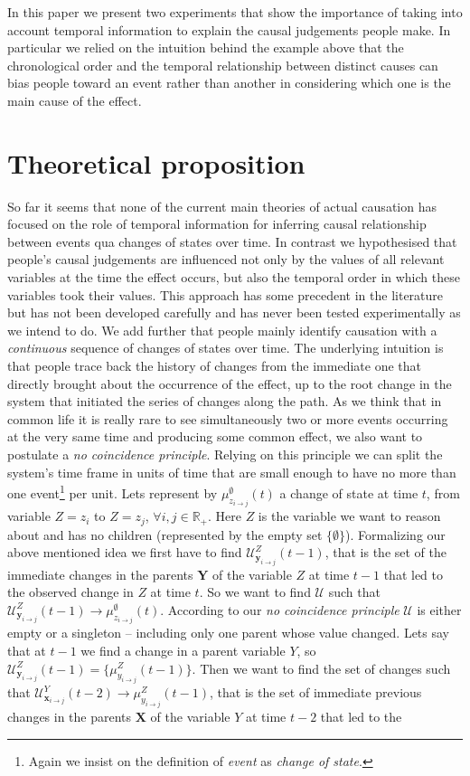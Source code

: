 \documentclass[10pt,letterpaper]{article}
\begin{document}
In this paper we present two experiments that show the importance of taking into account temporal information to explain the causal judgements people make. In particular we relied on the intuition behind the example above that the chronological order and the temporal relationship between distinct causes can bias people toward an event rather than another in considering which one is the main cause of the effect.

\section{Theoretical proposition}

So far it seems that none of the current main theories of actual causation has focused on the role of temporal information for inferring causal relationship between events qua changes of states over time. In contrast we hypothesised that people's causal judgements are influenced not only by the values of all relevant variables at the time the effect occurs, but also the temporal order in which these variables took their values. This approach has some precedent in the literature but has not been developed carefully and has never been tested experimentally as we intend to do. We add further that people mainly identify causation with a \textit{continuous} sequence of changes of states over time. The underlying intuition is that people trace back the history of changes from the immediate one that directly brought about the occurrence of the effect, up to the root change in the system that initiated the series of changes along the path. As we think that in common life it is really rare to see simultaneously two or more events occurring at the very same time and producing some common effect, we also want to postulate a \textit{no coincidence principle}. Relying on this principle we can split the system's time frame in units of time that are small enough to have no more than one event\footnote{Again we insist on the definition of \textit{event} as \textit{change of state}.} per unit. Lets represent by $\mu^{\emptyset}_{z_{i\rightarrow j}}(t)$ a change of state at time $t$, from variable $Z=z_i$ to $Z=z_j$, $\forall i,j\in \mathds{R}_+$. Here $Z$ is the variable we want to reason about and has no children (represented by the empty set $\{\emptyset\}$). Formalizing our above mentioned idea we first have to find $\mathcal{U}^Z_{\bm{y}_{i\rightarrow j}}(t-1)$, that is the set of the immediate changes in the parents $\bm{Y}$ of the variable $Z$ at time $t-1$ that led to the observed change in $Z$ at time $t$. So we want to find $\mathcal{U}$ such that $\mathcal{U}^Z_{\bm{y}_{i\rightarrow j}}(t-1)\rightarrow \mu^{\emptyset}_{z_{i\rightarrow j}}(t)$. According to our \textit{no coincidence principle} $\mathcal{U}$ is either empty or a singleton -- including only one parent whose value changed. Lets say that at $t-1$ we find a change in a parent variable $Y$, so $\mathcal{U}^Z_{\bm{y}_{i\rightarrow j}}(t-1)=\{\mu^{Z}_{y_{i\rightarrow j}}(t-1)\}$. Then we want to find the set of changes such that $\mathcal{U}^Y_{\bm{x}_{i\rightarrow j}}(t-2)\rightarrow \mu^{Z}_{y_{i\rightarrow j}}(t-1)$, that is the set of immediate previous changes in the parents $\bm{X}$ of the variable $Y$ at time $t-2$ that led to the 
\end{document}
